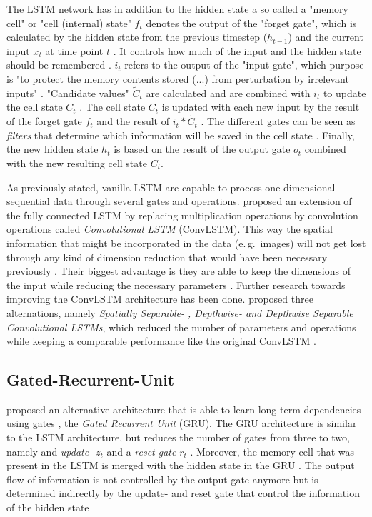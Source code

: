 \documentclass[11pt,
  paper=a4, 
  bibliography=totocnumbered,
	captions=tableheading,
	BCOR=10mm
]{scrreprt}
\theoremstyle{definition}
\newcommand{\eg}{e.\,g.~}
\begin{document}
The LSTM network has in addition to the hidden state a so called a "memory cell" \cite{Hochreiter1997} or "cell (internal) state" \cite{Valipour2017, Skansi2018,Olah2015, Yurdakul2017}
$f_t$ denotes the output of the "forget gate", which is calculated by the hidden state from the previous timestep ($h_{t-1}$) and the current input $x_t$ at time point $t$ \cite{Olah2015}.
It controls how much of the input and the hidden state should be remembered \cite{Skansi2018}.
$i_t$ refers to the output of the "input gate", which purpose is "to protect the memory contents stored (...) from perturbation by irrelevant inputs" \cite{Hochreiter1997}.
"Candidate values" \cite{Olah2015} $\widetilde{C}_t$ are calculated and are combined with $i_t$ to update the cell state $C_t$ \cite{Hochreiter1997}.
The cell state $C_t$ is updated with each new input by the result of the forget gate $f_t$ and the result of $i_t * \widetilde{C}_t$ \cite{Chung2014}.
The different gates can be seen as \textit{filters} that determine which information will be saved in the cell state \cite{Skansi2018}.
Finally, the new hidden state $h_t$ is based on the result of the output gate $o_t$ combined with the new resulting cell state $C_t$.

As previously stated, vanilla LSTM are capable to process one dimensional sequential data through several gates and operations.
\textcite{Shi2015} proposed an extension of the fully connected LSTM by replacing multiplication operations by convolution operations called \textit{Convolutional LSTM} (ConvLSTM)\cite{Yurdakul2017, Nabavi2018}.
This way the spatial information that might be incorporated in the data (\eg images) will not get lost through any kind of dimension reduction that would have been necessary previously \cite{Shi2015}.
Their biggest advantage is they are able to keep the dimensions of the input while reducing the necessary parameters \cite{Pfeuffer2_2019}.
Further research towards improving the ConvLSTM architecture has been done.
\textcite{Pfeuffer2_2019} proposed three alternations, namely \textit{Spatially Separable- , Depthwise- and Depthwise Separable Convolutional LSTMs}, 
which reduced the number of parameters and operations while keeping a comparable performance like the original ConvLSTM \cite{Pfeuffer2_2019}.

\subsection{Gated-Recurrent-Unit} \label{sec:GRU}
\textcite{Cho2014} proposed an alternative architecture that is able to learn long term dependencies using gates \cite{Chung2014}, the \textit{Gated Recurrent Unit} (GRU).
The GRU architecture is similar to the LSTM architecture, but reduces the number of gates from three to two, namely and \textit{update-} $z_t$ and a \textit{reset gate} $r_t$ \cite{Dey2017}.
Moreover, the memory cell that was present in the LSTM is merged with the hidden state in the GRU \cite{Olah2015}.
The output flow of information is not controlled by the output gate anymore but is determined indirectly by the update- and reset gate that control the information of the hidden state \cite{Siam2018}
\end{document}
